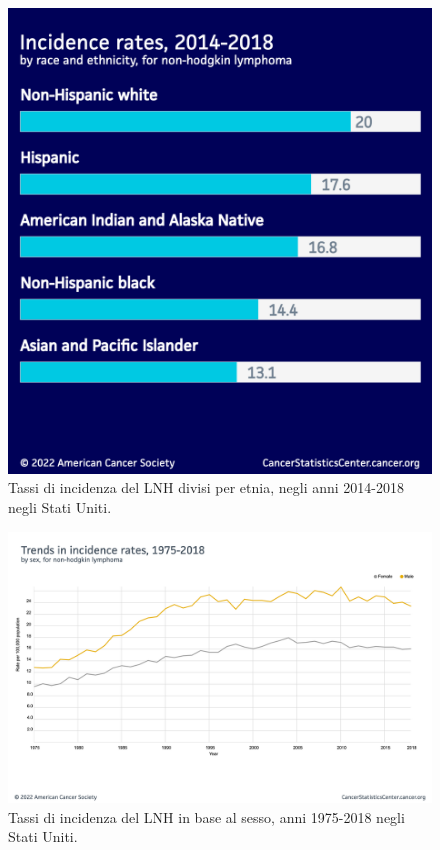 \begin{figure}[h]
    \begin{center}
    \includegraphics[width=0.5\columnwidth]{img/Incidence rates, 2014-2018 (by race and ethnicity).png}
    \end{center}
    \caption[Tassi di incidenza del LNH divisi per etnia, negli anni 2014-2018 negli Stati Uniti.]{Tassi di incidenza del LNH divisi per etnia, negli anni 2014-2018 negli Stati Uniti.
    \cite{img11}}

\end{figure}

\begin{figure}[h]
    \begin{center}
    \includegraphics[width=0.9\columnwidth]{img/Trends in incidence rates, 1975-2018 (by sex).png}
    \end{center}
    \caption[Tassi di incidenza del LNH in base al sesso, anni 1975-2018 negli Stati Uniti.]{Tassi di incidenza del LNH in base al sesso, anni 1975-2018 negli Stati Uniti.
    \cite{img12}}

\end{figure}

